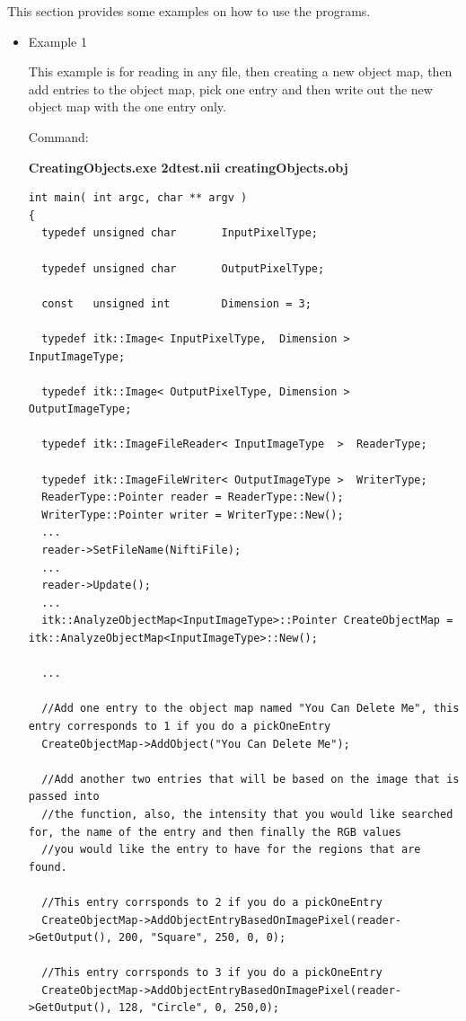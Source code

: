 \documentclass{InsightArticle}
\begin{document}
This section provides some examples on how to use the programs.
\begin{itemize}
\item Example 1 

This example is for reading in any file, then creating a new object map, then add entries to the object map, pick one entry and then write out the new object map with the one entry only.


Command:

\textbf{CreatingObjects.exe 2dtest.nii creatingObjects.obj}\\


\small \begin{verbatim}
int main( int argc, char ** argv )
{
  typedef unsigned char       InputPixelType;
  
  typedef unsigned char       OutputPixelType;
  
  const   unsigned int        Dimension = 3;
  
  typedef itk::Image< InputPixelType,  Dimension >    InputImageType;
  
  typedef itk::Image< OutputPixelType, Dimension >    OutputImageType;
  
  typedef itk::ImageFileReader< InputImageType  >  ReaderType;
  
  typedef itk::ImageFileWriter< OutputImageType >  WriterType;
  ReaderType::Pointer reader = ReaderType::New();
  WriterType::Pointer writer = WriterType::New();
  ...
  reader->SetFileName(NiftiFile);
  ...
  reader->Update();
  ...
  itk::AnalyzeObjectMap<InputImageType>::Pointer CreateObjectMap = itk::AnalyzeObjectMap<InputImageType>::New();
  
  ...
  
  //Add one entry to the object map named "You Can Delete Me", this entry corresponds to 1 if you do a pickOneEntry
  CreateObjectMap->AddObject("You Can Delete Me");

  //Add another two entries that will be based on the image that is passed into 
  //the function, also, the intensity that you would like searched for, the name of the entry and then finally the RGB values
  //you would like the entry to have for the regions that are found.

  //This entry corrsponds to 2 if you do a pickOneEntry
  CreateObjectMap->AddObjectEntryBasedOnImagePixel(reader->GetOutput(), 200, "Square", 250, 0, 0);

  //This entry corrsponds to 3 if you do a pickOneEntry
  CreateObjectMap->AddObjectEntryBasedOnImagePixel(reader->GetOutput(), 128, "Circle", 0, 250,0);


\end{verbatim}
\end{itemize}
\end{document}
